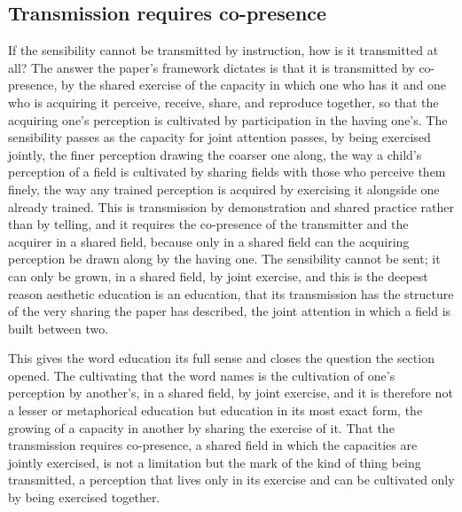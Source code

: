 \subsection{Transmission requires co-presence}
\label{p22:sub:trans-copresence}

If the sensibility cannot be transmitted by instruction, how is it transmitted at all? The answer the paper's framework dictates is that it is transmitted by co-presence, by the shared exercise of the capacity in which one who has it and one who is acquiring it perceive, receive, share, and reproduce together, so that the acquiring one's perception is cultivated by participation in the having one's. The sensibility passes as the capacity for joint attention passes, by being exercised jointly, the finer perception drawing the coarser one along, the way a child's perception of a field is cultivated by sharing fields with those who perceive them finely, the way any trained perception is acquired by exercising it alongside one already trained. This is transmission by demonstration and shared practice rather than by telling, and it requires the co-presence of the transmitter and the acquirer in a shared field, because only in a shared field can the acquiring perception be drawn along by the having one. The sensibility cannot be sent; it can only be grown, in a shared field, by joint exercise, and this is the deepest reason aesthetic education is an education, that its transmission has the structure of the very sharing the paper has described, the joint attention in which a field is built between two.


This gives the word education its full sense and closes the question the section opened. The cultivating that the word names is the cultivation of one's perception by another's, in a shared field, by joint exercise, and it is therefore not a lesser or metaphorical education but education in its most exact form, the growing of a capacity in another by sharing the exercise of it. That the transmission requires co-presence, a shared field in which the capacities are jointly exercised, is not a limitation but the mark of the kind of thing being transmitted, a perception that lives only in its exercise and can be cultivated only by being exercised together.

